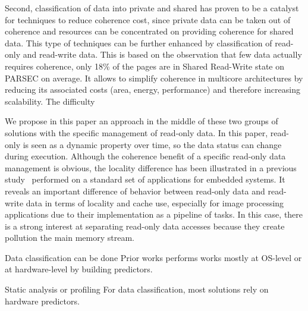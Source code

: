 \documentclass[sigconf]{acmart}
\begin{document}
Second, classification of data into private and shared has proven to be a catalyst for techniques to reduce coherence cost, since private data can be taken out of coherence and resources can be concentrated on providing coherence for shared data. This type of techniques can be further enhanced by classification of read-only and read-write data. This is based on the observation that few data actually requires coherence, only 18\% of the pages are in Shared Read-Write state on PARSEC on average\cite{Cuesta:2013}. It allows to simplify coherence in multicore architectures by reducing its associated costs (area, energy, performance) and therefore increasing scalability. 
The difficulty 

We propose in this paper an approach in the middle of these two groups of solutions with the specific management of read-only data. In this paper, read-only is seen as a dynamic property over time, so the data status can change during execution. Although the coherence benefit of a specific read-only data management is obvious, the locality difference has been illustrated in a previous study~\cite{vaumourin:2014} performed on a standard set of applications for embedded systems. It reveals an important difference of behavior between read-only data and read-write data in terms of locality and cache use, especially for image processing applications due to their implementation as a pipeline of tasks. In this case, there is a strong interest at separating read-only data accesses because they create pollution the main memory stream.

Data classification can be done 
Prior works performs works mostly at OS-level or at hardware-level by building predictors. 

Static analysis or profiling      
For data classification, most solutions rely on hardware predictors. 


\end{document}
